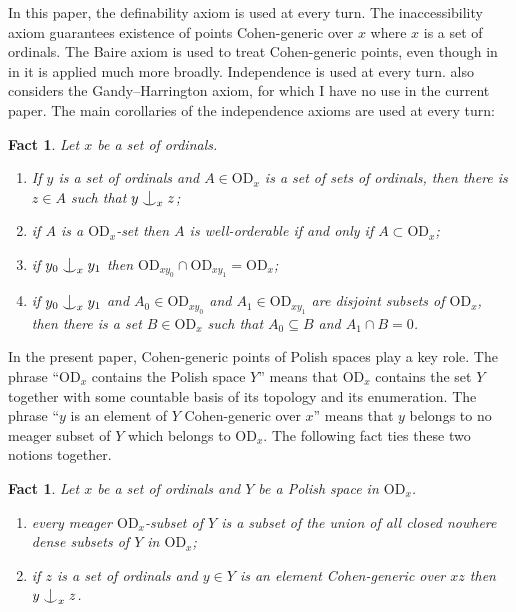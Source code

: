 \documentclass{article}
\newcommand{\vd}{\mathrm{OD}}
\newcommand{\forkindep}[1][]{%
  \mathrel{
    \mathop{
      \vcenter{
        \hbox{\oalign{\noalign{\kern-.3ex}\hfil$\vert$\hfil\cr
              \noalign{\kern-.7ex}
              $\smile$\cr\noalign{\kern-.3ex}}}
      }
    }\displaylimits_{#1}
  }
}
\newtheorem{fact}[theorem]{Fact}
\theoremstyle{definition}
\begin{document}
\noindent In this paper, the definability axiom is used at every turn. The inaccessibility axiom guarantees existence of points Cohen-generic over $x$ where $x$ is a set of ordinals. The Baire axiom is used to treat Cohen-generic points, even though in in \cite{z:reloadedA} it is applied much more broadly. Independence is used at every turn. \cite[Section 6]{z:reloadedA} also considers the Gandy--Harrington axiom, for which I have no use in the current paper. The main corollaries of the independence axioms are used at every turn:

\begin{fact}
\label{fact1}
Let $x$ be a set of ordinals.

\begin{enumerate}
\item If $y$ is a set of ordinals and $A\in\vd_x$ is a set of sets of ordinals, then there is $z\in A$ such that $y\forkindep[x]z$;
\item if $A$ is a $\vd_x$-set then $A$ is well-orderable if and only if $A\subset\vd_x$;
\item if $y_0\forkindep[x]y_1$ then $\vd_{xy_0}\cap\vd_{xy_1}=\vd_x$;
\item if $y_0\forkindep[x]y_1$ and $A_0\in\vd_{xy_0}$ and $A_1\in\vd_{xy_1}$ are disjoint subsets of $\vd_x$, then there is a set $B\in\vd_x$ such that $A_0\subseteq B$ and $A_1\cap B=0$.
\end{enumerate}
\end{fact}

\noindent In the present paper, Cohen-generic points of Polish spaces play a key role. The phrase ``$\vd_x$ contains the Polish space $Y$'' means that $\vd_x$ contains the set $Y$ together with some countable basis of its topology and its enumeration. The phrase ``$y$ is an element of $Y$ Cohen-generic over $x$'' means that $y$ belongs to no meager subset of $Y$ which belongs to $\vd_x$. The following fact ties these two notions together.

\begin{fact}
\label{fact2}
Let $x$ be a set of ordinals and $Y$ be a Polish space in $\vd_x$.

\begin{enumerate}
\item every meager $\vd_x$-subset of $Y$ is a subset of the union of all closed nowhere dense subsets of $Y$ in $\vd_x$;
\item if $z$ is a set of ordinals and $y\in Y$ is an element Cohen-generic over ${xz}$ then $y\forkindep_xz$.
\end{enumerate}
\end{fact}
\end{document}

